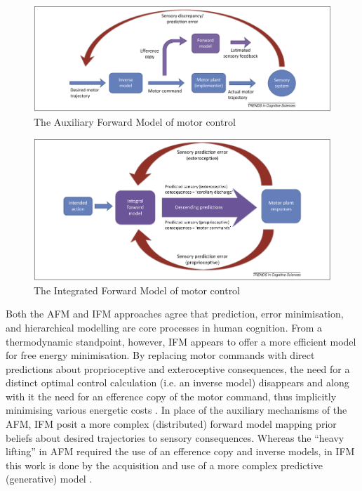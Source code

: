 \begin{CJK}{UTF8}{gbsn}
\begin{figure}[htbp]
  \begin{center}
    \includegraphics[scale=.3]{images/AFM.png}
      \caption{The Auxiliary Forward Model of motor control}
        \label{fig:AFM}
   \end{center}
\end{figure}

\begin{figure}[htbp]
  \begin{center}
    \includegraphics[scale=.3]{images/IFM.png}
      \caption{The Integrated Forward Model of motor control}
        \label{fig:IFM}
   \end{center}
\end{figure}


Both the AFM and IFM approaches agree that prediction, error minimisation, and hierarchical modelling are core processes in human cognition. From a thermodynamic standpoint, however, IFM appears to offer a more efficient model for free energy minimisation.  By replacing motor commands with direct predictions about proprioceptive and exteroceptive consequences, the need for a distinct optimal control calculation (i.e. an inverse model) disappears and along with it the need for an efference copy of the motor command, thus implicitly minimising various energetic costs \citep{Pickering2014,Friston2010}.   In place of the auxiliary mechanisms of the AFM, IFM posit a more complex (distributed) forward model mapping prior beliefs about desired trajectories to sensory consequences.  Whereas the ``heavy lifting'' in AFM required the use of an efference copy and inverse models, in IFM this work is done by the acquisition and use of a more complex predictive (generative) model \citep{Pickering2014}.



\end{CJK}

